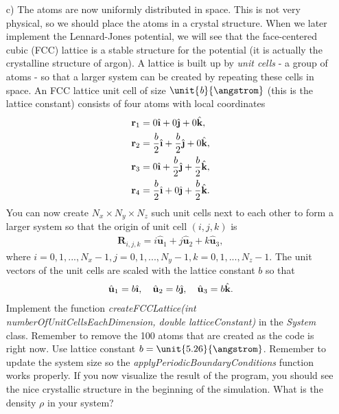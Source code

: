 \documentclass[a4wide,12pt]{article}
\renewcommand{\vec}{\mathbf}
\newcommand{\ihat}{\hat{\textbf{\i}}}
\newcommand{\jhat}{\hat{\textbf{\j}}}
\newcommand{\khat}{\hat{\textbf{k}}}
\begin{document}
\begin{enumerate}
\item[c)] 
The atoms are now uniformly distributed in space. This is not very physical, so we should place the atoms in a crystal structure. When we later implement the Lennard-Jones potential, we will see that the face-centered cubic (FCC) lattice is a stable structure for the potential (it is actually the crystalline structure of argon). A lattice is built up by \textit{unit cells} - a group of atoms - so that a larger system can be created by repeating these cells in space. An FCC lattice unit cell of size $\unit{\textit{b}}{\angstrom}$ (this is the lattice constant) consists of four atoms with local coordinates
\begin{align}
	\vec r_1 &= 0 \ihat + 0 \jhat + 0 \khat,\\
	\vec r_2 &= \frac{b}{2} \ihat + \frac{b}{2} \jhat + 0 \khat,\\
	\vec r_3 &= 0 \ihat + \frac{b}{2} \jhat + \frac{b}{2} \khat,\\
	\vec r_4 &= \frac{b}{2} \ihat + 0 \jhat + \frac{b}{2} \khat.
\end{align}
You can now create $N_x \times N_y \times N_z$ such unit cells next to each other to form a larger system so that the origin of unit cell $(i,j,k)$ is
\begin{align}
	\vec R_{i,j,k} = i \hat{\textbf{u}}_1 + j \hat{\textbf{u}}_2 + k \hat{\textbf{u}}_3,
\end{align}
where $i=0,1,..., N_x-1, j=0,1,..., N_y-1, k=0,1,..., N_z-1$. The unit vectors of the unit cells are scaled with the lattice constant $b$ so that
\begin{align}
	\hat{\textbf{u}}_1 = b\ihat, \quad \hat{\textbf{u}}_2 = b\jhat, \quad \hat{\textbf{u}}_3 = b\khat.
\end{align}
Implement the function \textit{createFCCLattice(int numberOfUnitCellsEachDimension, double latticeConstant)} in the \textit{System} class. Remember to remove the 100 atoms that are created as the code is right now. Use lattice constant $b=\unit{5.26}{\angstrom}$. Remember to update the system size so the \textit{applyPeriodicBoundaryConditions} function works properly. If you now visualize the result of the program, you should see the nice crystallic structure in the beginning of the simulation. What is the density $\rho$ in your system?


\end{enumerate}
\end{document}
